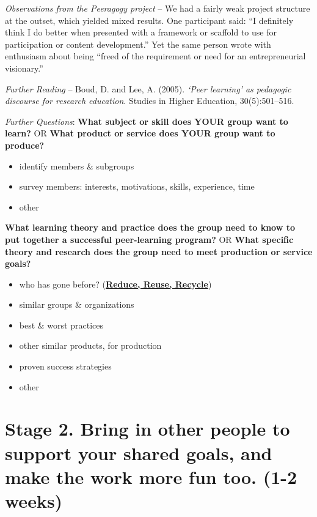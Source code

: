 \emph{Observations from the Peeragogy project} -- We had a fairly weak
project structure at the outset, which yielded mixed results. One
participant said: ``I definitely think I do better when presented with a
framework or scaffold to use for participation or content development.''
Yet the same person wrote with enthusiasm about being ``freed of the
requirement or need for an entrepreneurial visionary.''

\emph{Further Reading} -- Boud, D. and Lee, A. (2005). \emph{`Peer
learning' as pedagogic discourse for research education}. Studies in
Higher Education, 30(5):501--516.

\emph{Further Questions}: \textbf{What subject or skill does YOUR group
want to learn?} OR \textbf{What product or service does YOUR group want
to produce?}

\begin{itemize}
\tightlist
\item
  identify members \& subgroups
\item
  survey members: interests, motivations, skills, experience, time
\item
  other
\end{itemize}

\textbf{What learning theory and practice does the group need to know to
put together a successful peer-learning program?} OR \textbf{What
specific theory and research does the group need to meet production or
service goals?}

\begin{itemize}
\tightlist
\item
  who has gone before?
  (\href{http://peeragogy.github.io/practice.html}{\textbf{Reduce,
  Reuse, Recycle}})
\item
  similar groups \& organizations
\item
  best \& worst practices
\item
  other similar products, for production
\item
  proven success strategies
\item
  other
\end{itemize}

\hypertarget{stage-2.-bring-in-other-people-to-support-your-shared-goals-and-make-the-work-more-fun-too.-1-2-weeks}{%
\section{Stage 2. Bring in other people to support your shared goals,
and make the work more fun too. (1-2
weeks)}\label{stage-2.-bring-in-other-people-to-support-your-shared-goals-and-make-the-work-more-fun-too.-1-2-weeks}}

